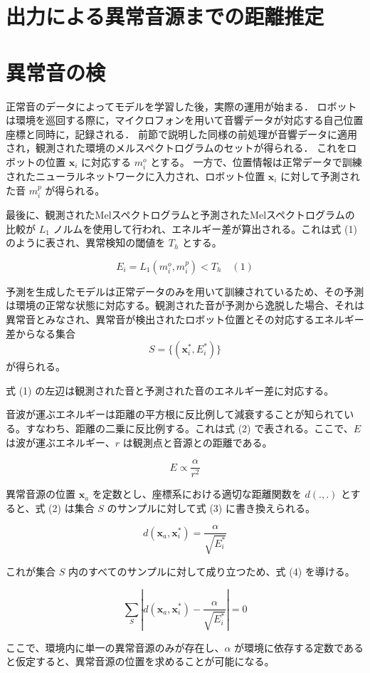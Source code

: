 \documentclass[../main]{subfiles}
\begin{document}
\section{出力による異常音源までの距離推定}
\label{sec:pmethod_anomaly_detection}

\section{異常音の検}
正常音のデータによってモデルを学習した後，実際の運用が始まる．
ロボットは環境を巡回する際に，マイクロフォンを用いて音響データが対応する自己位置座標と同時に，記録される．
前節で説明した同様の前処理が音響データに適用され，観測された環境のメルスペクトログラムのセットが得られる．
これをロボットの位置 $\mathbf{x}_i$ に対応する $m_i^o$ とする。
一方で、位置情報は正常データで訓練されたニューラルネットワークに入力され、ロボット位置 $\mathbf{x}_i$ に対して予測された音 $m_i^p$ が得られる。

最後に、観測されたMelスペクトログラムと予測されたMelスペクトログラムの比較が $L_1$ ノルムを使用して行われ、エネルギー差が算出される。これは式 (1) のように表され、異常検知の閾値を $T_h$ とする。

\begin{equation}
    E_i = L_1(m_i^o, m_i^p) < T_h \quad (1)
\end{equation}

予測を生成したモデルは正常データのみを用いて訓練されているため、その予測は環境の正常な状態に対応する。観測された音が予測から逸脱した場合、それは異常音とみなされ、異常音が検出されたロボット位置とその対応するエネルギー差からなる集合
\[
S = \{ (\mathbf{x}_i^*, E_i^*) \}
\]
が得られる。

\label{sec:pmethod_preprocessing}


式 (1) の左辺は観測された音と予測された音のエネルギー差に対応する。

音波が運ぶエネルギーは距離の平方根に反比例して減衰することが知られている。すなわち、距離の二乗に反比例する。これは式 (2) で表される。ここで、$E$ は波が運ぶエネルギー、$r$ は観測点と音源との距離である。

\begin{equation}
    E \propto \frac{\alpha}{r^2} \tag{2}
\end{equation}

異常音源の位置 $\mathbf{x}_a$ を定数とし、座標系における適切な距離関数を $d(., .)$ とすると、式 (2) は集合 $S$ のサンプルに対して式 (3) に書き換えられる。

\begin{equation}
    d(\mathbf{x}_a, \mathbf{x}_i^*) = \frac{\alpha}{\sqrt{E_i^*}} \tag{3}
\end{equation}

これが集合 $S$ 内のすべてのサンプルに対して成り立つため、式 (4) を導ける。

\begin{equation}
    \sum_{S} \left| d(\mathbf{x}_a, \mathbf{x}_i^*) - \frac{\alpha}{\sqrt{E_i^*}} \right| = 0 \tag{4}
\end{equation}

ここで、環境内に単一の異常音源のみが存在し、$\alpha$ が環境に依存する定数であると仮定すると、異常音源の位置を求めることが可能になる。
\end{document}
